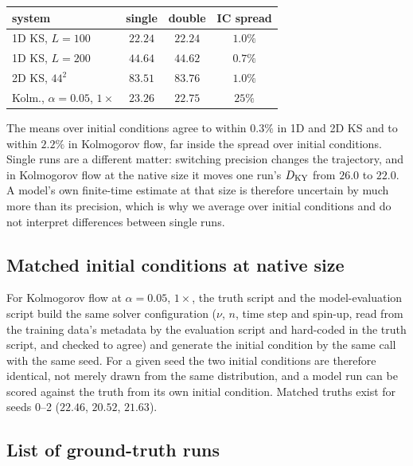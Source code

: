 \begin{center}
\begin{tabular}{lccc}
\hline\hline
system & single & double & IC spread \\
\hline
1D KS, $L=100$ & $22.24$ & $22.24$ & $1.0\%$ \\
1D KS, $L=200$ & $44.64$ & $44.62$ & $0.7\%$ \\
2D KS, $44^2$ & $83.51$ & $83.76$ & $1.0\%$ \\
Kolm., $\alpha=0.05$, $1\times$ & $23.26$ & $22.75$ & $25\%$ \\
\hline\hline
\end{tabular}
\end{center}
The means over initial conditions agree to within $0.3\%$ in 1D and 2D
KS and to within $2.2\%$ in Kolmogorov flow, far inside the spread over
initial conditions. Single runs are a different matter: switching
precision changes the trajectory, and in Kolmogorov flow at the native
size it moves one run's $D_{\mathrm{KY}}$ from $26.0$ to $22.0$. A model's own
finite-time estimate at that size is therefore uncertain by much more
than its precision, which is why we average over initial conditions and
do not interpret differences between single runs.

\subsection{Matched initial conditions at native size}
\label{app:matched_ics}

For Kolmogorov flow at $\alpha=0.05$, $1\times$, the truth script and the
model-evaluation script build the same solver configuration ($\nu$, $n$,
time step and spin-up, read from the training data's metadata by the
evaluation script and hard-coded in the truth script, and checked to
agree) and generate the initial condition by the same call with the same
seed. For a given seed the two initial conditions are therefore
identical, not merely drawn from the same distribution, and a model run
can be scored against the truth from its own initial condition. Matched
truths exist for seeds 0--2 ($22.46$, $20.52$, $21.63$).

\subsection{List of ground-truth runs}
\label{app:truth_list}

